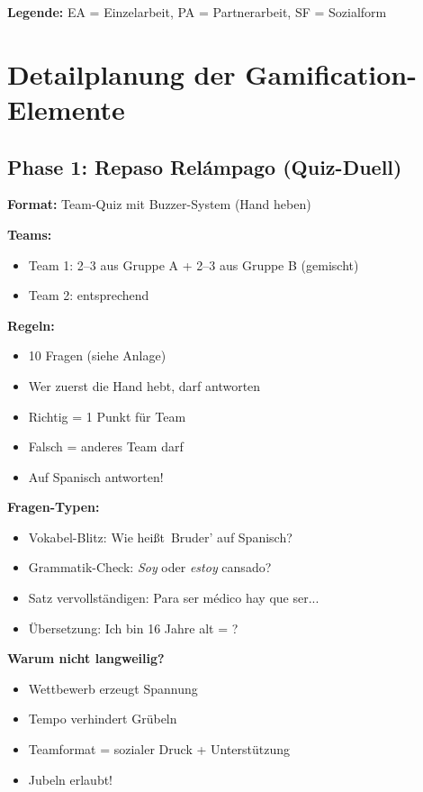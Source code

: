 \documentclass[11pt,a4paper]{article}
\begin{document}
\textbf{Legende:} EA = Einzelarbeit, PA = Partnerarbeit, SF = Sozialform

\section{Detailplanung der Gamification-Elemente}

\subsection{Phase 1: Repaso Relámpago (Quiz-Duell)}

\begin{gamebox}
\textbf{Format:} Team-Quiz mit Buzzer-System (Hand heben)

\textbf{Teams:}
\begin{itemize}
    \item Team 1: 2--3 aus Gruppe A + 2--3 aus Gruppe B (gemischt)
    \item Team 2: entsprechend
\end{itemize}

\textbf{Regeln:}
\begin{itemize}
    \item 10 Fragen (siehe Anlage)
    \item Wer zuerst die Hand hebt, darf antworten
    \item Richtig = 1 Punkt für Team
    \item Falsch = anderes Team darf
    \item Auf Spanisch antworten!
\end{itemize}

\textbf{Fragen-Typen:}
\begin{itemize}
    \item Vokabel-Blitz: \glqq{}Wie heißt \,Bruder' auf Spanisch?\grqq{}
    \item Grammatik-Check: \glqq{}\textit{Soy} oder \textit{estoy} cansado?\grqq{}
    \item Satz vervollständigen: \glqq{}Para ser médico hay que ser...\grqq{}
    \item Übersetzung: \glqq{}Ich bin 16 Jahre alt = ?\grqq{}
\end{itemize}

\textbf{Warum nicht langweilig?}
\begin{itemize}
    \item Wettbewerb erzeugt Spannung
    \item Tempo verhindert Grübeln
    \item Teamformat = sozialer Druck + Unterstützung
    \item Jubeln erlaubt!
\end{itemize}
\end{gamebox}
\end{document}

